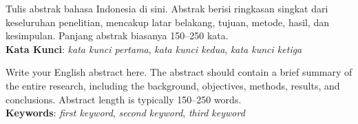 \documentclass{skripsi}
\begin{document}
{\abstractind

  \noindent
  Tulis abstrak bahasa Indonesia di sini. Abstrak berisi ringkasan
  singkat dari keseluruhan penelitian, mencakup latar belakang, tujuan,
  metode, hasil, dan kesimpulan. Panjang abstrak biasanya 150--250 kata.\\

  \noindent
  \textbf{Kata Kunci}: \emph{kata kunci pertama},
  \emph{kata kunci kedua}, \emph{kata kunci ketiga}

}

{\abstracteng

  \noindent
  Write your English abstract here. The abstract should contain a brief
  summary of the entire research, including the background, objectives,
  methods, results, and conclusions. Abstract length is typically
  150--250 words.\\

  \noindent
  \textbf{Keywords}: \emph{first keyword},
  \emph{second keyword}, \emph{third keyword}

}

\tableofcontents
{}
\listoftables
{}
\listoffigures
{}

\clearpage{}\setcounter{page}{1}




% 
% 
% 
% 

\printbibliography[title={DAFTAR PUSTAKA}]
\end{document}
